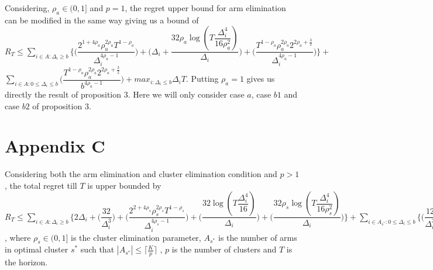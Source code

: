 \begin{remark}
\label{App:B:Rem:3}
Considering, $\rho_{a}\in (0,1]$ and $p=1$, the regret upper bound for arm elimination can be modified in the same way giving us a bound of
\newline
$R_{T}\leq \sum_{i\in A:\Delta_{i}\geq b}\bigg\lbrace\bigg(\dfrac{2^{1+4\rho_{a}}\rho_{a}^{2\rho_{a}}T^{1-\rho_{a}}}{\Delta_{i}^{4\rho_{a}-1}}\bigg) + \bigg(\Delta_{i}+\dfrac{32\rho_{a}\log{(T\dfrac{\Delta_{i}^{4}}{16\rho_{a}^{2}})}}{\Delta_{i}}\bigg)  +  \bigg(\dfrac{T^{1-\rho_{a}}\rho_{a}^{2\rho_{a}}2^{2\rho_{a}+\frac{3}{2}}}{\Delta_{i}^{4\rho_{a} -1}} \bigg) \bigg \rbrace+$\newline$\sum_{i\in A:0\leq\Delta_{i}\leq b}\bigg(\dfrac{T^{1-\rho_{a}}\rho_{a}^{2\rho_{a}}2^{2\rho_{a}+\frac{3}{2}}}{b^{4\rho_{a} -1}} \bigg) + max_{i:\Delta_{i}\leq b}\Delta_{i}T$. 
\newline
Putting $\rho_{a}=1$ gives us directly the result of proposition $3$. Here we will only consider case $a$, case $b1$ and case $b2$ of proposition $3$.
\end{remark}

\section{Appendix C}

\begin{theorem}
Considering both the arm elimination and cluster elimination condition and $p>1$, the total regret till $T$ is upper bounded by $R_{T}\leq \sum_{i\in A:\Delta_{i}\geq b} \bigg\lbrace 2\Delta_{i}+ \bigg(\dfrac{32}{\Delta_{i}^{3}}\bigg) + \bigg(\dfrac{2^{2+4\rho_{s}}\rho_{s}^{2\rho_{s}}T^{1-\rho_{s}}}{\Delta_{i}^{4\rho_{s}-1}}\bigg) + \bigg(\dfrac{32\log{(T\dfrac{\Delta_{i}^{4}}{16})}}{\Delta_{i}}\bigg) + \bigg(\dfrac{32\rho_{s}\log{(T\dfrac{\Delta_{i}^{4}}{16\rho_{s}^{2}})}}{\Delta_{i}}\bigg)\bigg\rbrace + \sum_{i\in A_{s^{*}}:0\leq\Delta_{i}\leq b}\bigg\lbrace \bigg(\dfrac{12}{\Delta_{i}^{3}} \bigg) + \bigg(\dfrac{12}{b^{3}} \bigg)\bigg\rbrace + \sum_{i\in A:0\leq\Delta_{i}\leq b}\bigg\lbrace \bigg(\dfrac{T^{1-\rho_{s}}\rho_{s}^{2\rho_{s}}2^{2\rho_{s}+3}}{\Delta_{i}^{4\rho_{s}-1}} \bigg)+\bigg(\dfrac{T^{1-\rho_{s}}\rho_{s}^{2\rho_{s}}2^{2\rho_{s}+3}}{b^{4\rho_{s} -1}} \bigg) \bigg\rbrace + max_{i:\Delta_{i}\leq b}\Delta_{i}T $, where $\rho_{s}\in (0,1]$ is the cluster elimination parameter, $A_{s^{*}}$ is the number of arms in optimal cluster $s^{*}$ such that $|A_{s^{*}}|\leq \big\lceil\frac{K}{p}\big\rceil$ , $p$ is the number of clusters and $T$ is the horizon.
\end{theorem}

